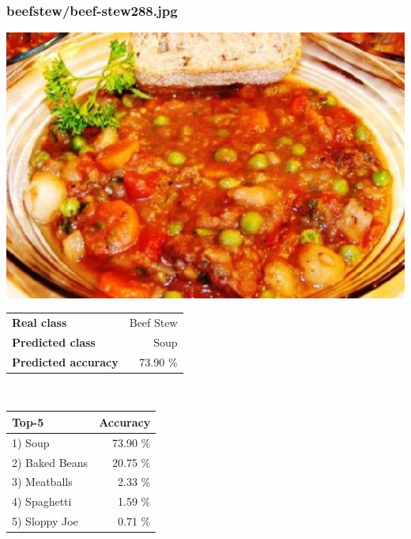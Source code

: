 \subsubsection{beef\textunderscore stew/beef-stew288.jpg}

\begin{minipage}[t]{0.4\textwidth}
	\vspace{0pt}
	\includegraphics[width=\linewidth]{images/evaluation-images/beef_stew/beef-stew288.jpg}
\end{minipage}
\hfill
\begin{minipage}[t]{0.5\textwidth}
	\vspace{0pt}\raggedright
	\begin{tabularx}{\textwidth}{X r}
		\small \textbf{Real class} & \small Beef Stew\\
		\small \textbf{Predicted class} & \small Soup\\
		\small \textbf{Predicted accuracy} & \small 73.90 \%
    \end{tabularx}\\
    
    \vspace{6pt}
	\begin{tabularx}{\textwidth}{X r}
        \small \textbf{Top-5} & \small \textbf{Accuracy} \\
        \hline
		\small 1) Soup & \small 73.90 \%\\\small 2) Baked Beans & \small 20.75 \%\\\small 3) Meatballs & \small 2.33 \%\\\small 4) Spaghetti & \small 1.59 \%\\\small 5) Sloppy Joe & \small 0.71 \%
    \end{tabularx}
\end{minipage}
    
